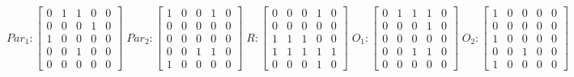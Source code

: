      $$
        Par_{1} : \begin{bmatrix}
            0 & 1 & 1 & 0 & 0 \\
            0 & 0 & 0 & 1 & 0 \\
            1 & 0 & 0 & 0 & 0 \\
			0 & 0 & 1 & 0 & 0 \\
            0 & 0 & 0 & 0 & 0 
        \end{bmatrix}
        \;
        Par_{2} : \begin{bmatrix}
            1 & 0 & 0 & 1 & 0 \\
            0 & 0 & 0 & 0 & 0 \\
            0 & 0 & 0 & 0 & 0 \\
            0 & 0 & 1 & 1 & 0 \\
            1 & 0 & 0 & 0 & 0
        \end{bmatrix}
        \;
        R : \begin{bmatrix}
            0 & 0 & 0 & 1 & 0 \\
            0 & 0 & 0 & 0 & 0 \\
            1 & 1 & 1 & 0 & 0 \\
            1 & 1 & 1 & 1 & 1 \\
            0 & 0 & 0 & 1 & 0
        \end{bmatrix}
        \;
        O_{1} : \begin{bmatrix}
            0 & 1 & 1 & 1 & 0 \\
            0 & 0 & 0 & 1 & 0 \\
            0 & 0 & 0 & 0 & 0 \\
            0 & 0 & 1 & 1 & 0 \\
            0 & 0 & 0 & 0 & 0
        \end{bmatrix}
        \;
        O_{2} : \begin{bmatrix}
            1 & 0 & 0 & 0 & 0 \\
            0 & 0 & 0 & 0 & 0 \\
            1 & 0 & 0 & 0 & 0 \\
            0 & 0 & 1 & 0 & 0 \\
            1 & 0 & 0 & 0 & 0
        \end{bmatrix}
    $$ 
